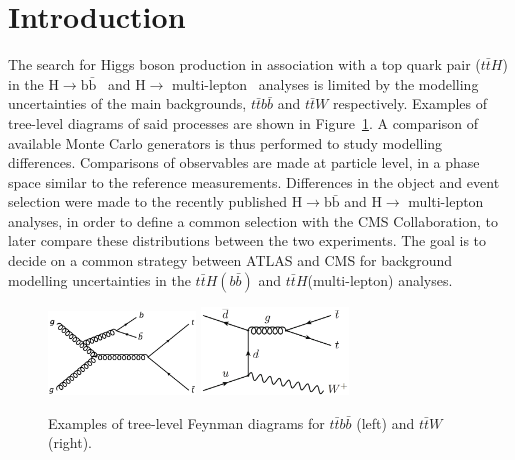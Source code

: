 \section{Introduction}
\label{sec:intro}
The search for Higgs boson production in association with a top quark pair ($t\bar{t}H$) in the $\mathrm{H\rightarrow b\bar{b}}$~\cite{HIGG-2017-03} and $\mathrm{H\rightarrow}$ multi-lepton~\cite{ATLAS-CONF-2019-045} analyses is limited by the modelling uncertainties of the main backgrounds, $t\bar{t}b\bar{b}$ and $t\bar{t}W$ respectively. %
Examples of tree-level diagrams of said processes are shown in Figure~\ref{intro:sig}. A comparison of available Monte Carlo generators is thus performed to study modelling differences. Comparisons of observables are made at particle level, in a phase space similar to the reference measurements. Differences in the object and event selection were made to the recently published $\mathrm{H\rightarrow b\bar{b}}$ and $\mathrm{H\rightarrow}$ multi-lepton analyses, in order to define a common selection with the CMS Collaboration, to later compare these distributions between the two experiments. The goal is to decide on a common strategy between ATLAS and CMS for background modelling uncertainties in the $t\bar{t}H(b\bar{b})$ and $t\bar{t}H$(multi-lepton) analyses.

\begin{figure}[!htb]
\centering
\includegraphics[width=0.35\textwidth]{Plots/ttbb/ttbb}
\includegraphics[width=0.35\textwidth]{Plots/ttV/ttW}
  \caption{Examples of tree-level Feynman diagrams for $t\bar{t}b\bar{b}$ (left) and $t\bar{t}W$ (right). \label{intro:sig}}
\end{figure}
